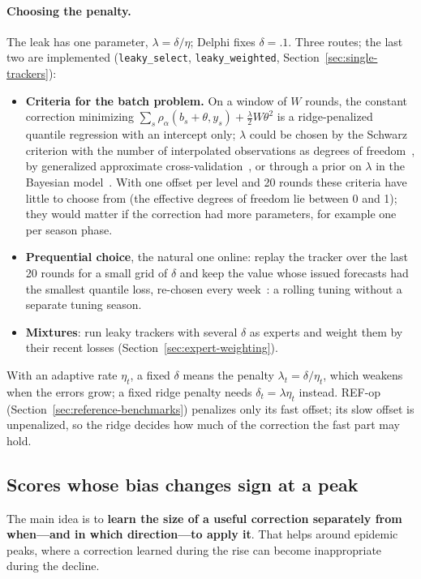 \documentclass[11pt,a4paper]{article}
\theoremstyle{definition}
\theoremstyle{remark}
\begin{document}
\paragraph{Choosing the penalty.} The leak has one parameter,
$\lambda=\delta/\eta$; Delphi fixes $\delta=.1$. Three routes; the last two
are implemented (\texttt{leaky\_select}, \texttt{leaky\_weighted},
Section~\ref{sec:single-trackers}):
\begin{itemize}[leftmargin=*,itemsep=2pt]
\item \textbf{Criteria for the batch problem.} On a window of $W$ rounds,
the constant correction minimizing
$\sum_s\rho_\alpha(b_s+\theta,y_s)+\frac\lambda2W\theta^2$ is a
ridge-penalized quantile regression with an intercept only; $\lambda$ could
be chosen by the Schwarz criterion with the number of interpolated
observations as degrees of freedom~\cite{koenker-ng-portnoy}, by
generalized approximate cross-validation~\cite{yuan-gacv}, or through a
prior on $\lambda$ in the Bayesian model~\cite{li-xi-lin}. With one offset
per level and 20 rounds these criteria have little to choose from (the
effective degrees of freedom lie between 0 and 1); they would matter if
the correction had more parameters, for example one per season phase.
\item \textbf{Prequential choice}, the natural one online: replay the
tracker over the last 20 rounds for a small grid of $\delta$ and keep the
value whose issued forecasts had the smallest quantile loss, re-chosen
every week~\cite{dawid-prequential}: a rolling tuning without a separate
tuning season.
\item \textbf{Mixtures}: run leaky trackers with several $\delta$ as
experts and weight them by their recent losses
(Section~\ref{sec:expert-weighting}).
\end{itemize}
With an adaptive rate $\eta_t$, a fixed $\delta$ means the penalty
$\lambda_t=\delta/\eta_t$, which weakens when the errors grow; a fixed
ridge penalty needs $\delta_t=\lambda\eta_t$ instead. REF-op
(Section~\ref{sec:reference-benchmarks}) penalizes only its fast offset;
its slow offset is unpenalized, so the ridge decides how much of the
correction the fast part may hold.

\subsection{Scores whose bias changes sign at a peak}
\label{sec:sign-flip}
The main idea is to \textbf{learn the size of a useful correction separately
from when---and in which direction---to apply it}. That helps around
epidemic peaks, where a correction learned during the rise can become
inappropriate during the decline.
\end{document}
